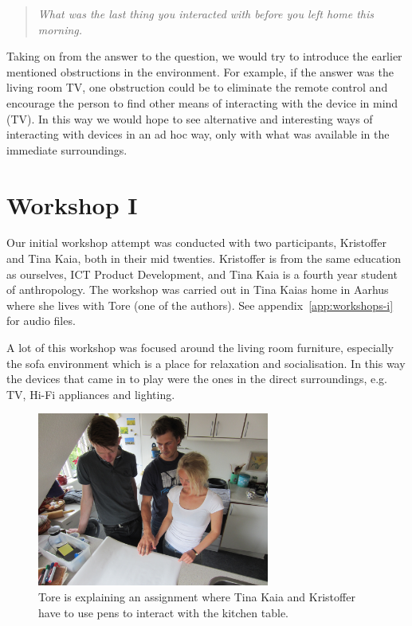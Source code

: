 \begin{quotation}
  \emph{What was the last thing you interacted with before you left home this morning.}
\end{quotation}

Taking on from the answer to the question, we would try to introduce the earlier mentioned obstructions in the environment.
For example, if the answer was the living room TV, one obstruction could be to eliminate the remote control and encourage the person to find other means of interacting with the device in mind (TV).
In this way we would hope to see alternative and interesting ways of interacting with devices in an ad hoc way, only with what was available in the immediate surroundings.


\section{Workshop I}
\label{ch:workshops:workshop-i}
Our initial workshop attempt was conducted with two participants, Kristoffer and Tina Kaia, both in their mid twenties.
Kristoffer is from the same education as ourselves, ICT Product Development, and Tina Kaia is a fourth year student of anthropology.
The workshop was carried out in Tina Kaias home in Aarhus where she lives with Tore (one of the authors).
See appendix~\ref{app:workshops-i} for  audio files.

A lot of this workshop was focused around the living room furniture, especially the sofa environment which is a place for relaxation and socialisation.
In this way the devices that came in to play were the ones in the direct surroundings, e.g. TV, Hi-Fi appliances and lighting.

\begin{figure}[h]
  \centering
      \includegraphics[width=3in]{figures/kaia_moos1}
  \caption{Tore is explaining an assignment where Tina Kaia and Kristoffer have to use pens to interact with the kitchen table.}
   \label{kaia_moos1}
\end{figure}

